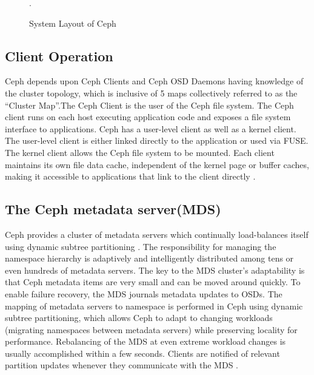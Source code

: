 \documentclass[9pt,twocolumn,twoside]{styles/osajnl}
\begin{document}
\begin{figure}[htbp]
\centering
{}
\caption{System Layout of Ceph \cite{paper-Ceph}}.
\label{CSL}
\end{figure}

\subsection{Client Operation} 
Ceph depends upon Ceph Clients and Ceph OSD Daemons having knowledge
of the cluster topology, which is inclusive of 5 maps collectively
referred to as the “Cluster Map”.The Ceph Client is the user of the
Ceph file system. The Ceph client runs on each host executing
application code and exposes a file system interface to
applications. Ceph has a user-level client as well as a kernel
client. The user-level client is either linked directly to the
application or used via FUSE. The kernel client allows the Ceph file
system to be mounted. Each client maintains its own file data cache,
independent of the kernel page or buffer caches, making it accessible
to applications that link to the client directly \cite{paper-Ceph}.
\subsection{The Ceph metadata server(MDS)}
Ceph provides a cluster of metadata servers which continually
load-balances itself using dynamic subtree partitioning
\cite{ceph-metadata}. The responsibility for managing the namespace
hierarchy is adaptively and intelligently distributed among tens or
even hundreds of metadata servers. The key to the MDS cluster’s
adaptability is that Ceph metadata items are very small and can be
moved around quickly. To enable failure recovery, the MDS journals
metadata updates to OSDs. The mapping of metadata servers to namespace
is performed in Ceph using dynamic subtree partitioning, which allows
Ceph to adapt to changing workloads (migrating namespaces between
metadata servers) while preserving locality for
performance. Rebalancing of the MDS at even extreme workload changes
is usually accomplished within a few seconds. Clients are notified of
relevant partition updates whenever they communicate with the MDS
\cite{www-ibm-ceph}.
\end{document}
